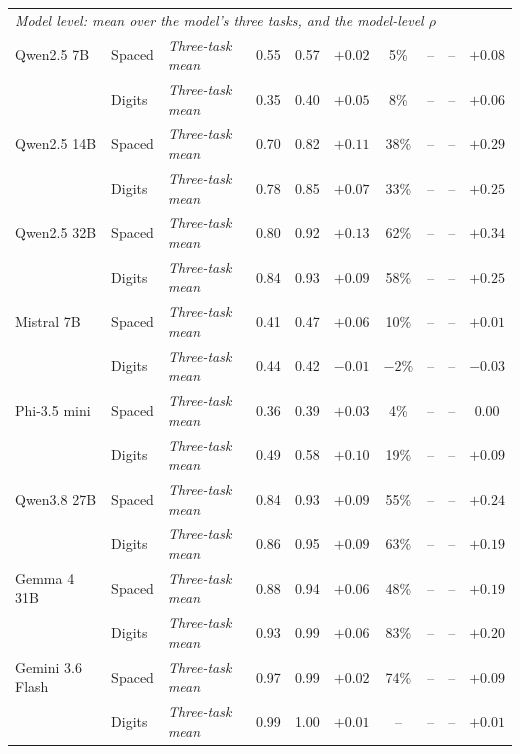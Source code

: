 {\begin{tabular}{lll ccc c cc c}
\midrule
\multicolumn{10}{l}{\emph{Model level: mean over the model's three tasks, and the model-level $\rho$}} \\
Qwen2.5 7B & Spaced & \emph{Three-task mean} & 0.55 & 0.57 & $+0.02$ & 5\% & -- & -- & $+0.08$ \\
 & Digits & \emph{Three-task mean} & 0.35 & 0.40 & $+0.05$ & 8\% & -- & -- & $+0.06$ \\
Qwen2.5 14B & Spaced & \emph{Three-task mean} & 0.70 & 0.82 & $+0.11$ & 38\% & -- & -- & $+0.29$ \\
 & Digits & \emph{Three-task mean} & 0.78 & 0.85 & $+0.07$ & 33\% & -- & -- & $+0.25$ \\
Qwen2.5 32B & Spaced & \emph{Three-task mean} & 0.80 & 0.92 & $+0.13$ & 62\% & -- & -- & $+0.34$ \\
 & Digits & \emph{Three-task mean} & 0.84 & 0.93 & $+0.09$ & 58\% & -- & -- & $+0.25$ \\
Mistral 7B & Spaced & \emph{Three-task mean} & 0.41 & 0.47 & $+0.06$ & 10\% & -- & -- & $+0.01$ \\
 & Digits & \emph{Three-task mean} & 0.44 & 0.42 & $-0.01$ & $-2\%$ & -- & -- & $-0.03$ \\
Phi-3.5 mini & Spaced & \emph{Three-task mean} & 0.36 & 0.39 & $+0.03$ & 4\% & -- & -- & $0.00$ \\
 & Digits & \emph{Three-task mean} & 0.49 & 0.58 & $+0.10$ & 19\% & -- & -- & $+0.09$ \\
Qwen3.8 27B & Spaced & \emph{Three-task mean} & 0.84 & 0.93 & $+0.09$ & 55\% & -- & -- & $+0.24$ \\
 & Digits & \emph{Three-task mean} & 0.86 & 0.95 & $+0.09$ & 63\% & -- & -- & $+0.19$ \\
Gemma 4 31B & Spaced & \emph{Three-task mean} & 0.88 & 0.94 & $+0.06$ & 48\% & -- & -- & $+0.19$ \\
 & Digits & \emph{Three-task mean} & 0.93 & 0.99 & $+0.06$ & 83\% & -- & -- & $+0.20$ \\
Gemini 3.6 Flash & Spaced & \emph{Three-task mean} & 0.97 & 0.99 & $+0.02$ & 74\% & -- & -- & $+0.09$ \\
 & Digits & \emph{Three-task mean} & 0.99 & 1.00 & $+0.01$ & -- & -- & -- & $+0.01$ \\
\bottomrule
\end{tabular}}
